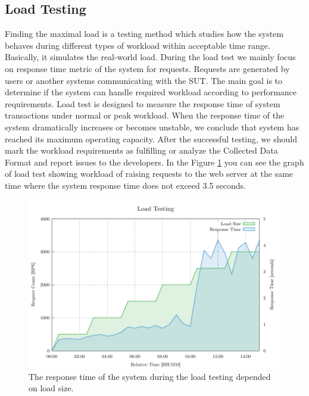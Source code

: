 \subsection*{Load Testing}
Finding the maximal load is a testing method which studies how the system behaves during different types of workload within acceptable time range. Basically, it simulates the real-world load. During the load test we mainly focus on response time metric of the system for requests. Requests are generated by users or another systems communicating with the SUT. The main goal is to determine if the system can handle required workload according to performance requirements. Load test is designed to measure the response time of system transactions under normal or peak workload. When the response time of the system dramatically increases or becomes unstable, we conclude that system has reached its maximum operating capacity. After the successful testing, we should mark the workload requirements as fulfilling or analyze the Collected Data Format and report issues to the developers. In the Figure \ref{fig:load_test} you can see the graph of load test showing workload of raising requests to the web server at the same time where the system response time does not exceed 3.5 seconds.

\begin{figure}[H]
  \centering
  \includegraphics[width=15cm]{obrazky-figures/load_testing.pdf}
  \caption{The response time of the system during the load testing depended on load size.}
  \label{fig:load_test}
\end{figure}

